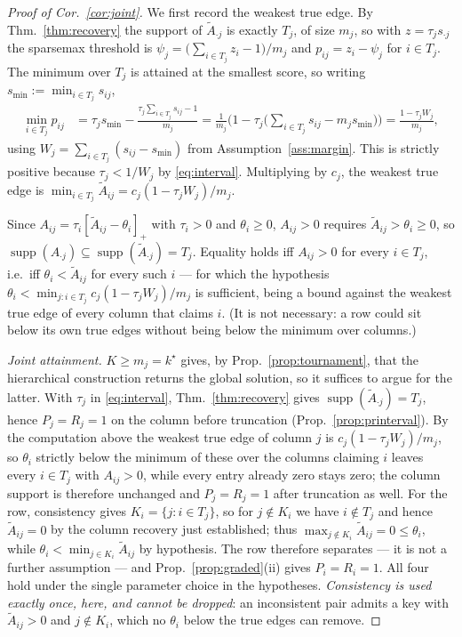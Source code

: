 \documentclass{article}
\newcommand{\supp}{\operatorname{supp}}
\begin{document}
\begin{proof}[Proof of Cor.~\ref{cor:joint}]
We first record the weakest true edge. By Thm.~\ref{thm:recovery} the support of $\tilde A_{\cdot j}$ is exactly $T_j$, of size
$m_j$, so with $z = \tau_j s_{\cdot j}$ the sparsemax threshold is
$\psi_j = \big(\sum_{i \in T_j} z_i - 1\big)/m_j$ and $p_{ij} = z_i - \psi_j$ for
$i \in T_j$. The minimum over $T_j$ is attained at the smallest score, so writing
$s_{\min} := \min_{i \in T_j} s_{ij}$,
\begin{align*}
\min_{i \in T_j} p_{ij}
&= \tau_j s_{\min} - \frac{\tau_j\sum_{i \in T_j} s_{ij} - 1}{m_j}
= \frac{1}{m_j}\Big(1 - \tau_j\Big(\sum_{i\in T_j} s_{ij} - m_j s_{\min}\Big)\Big)
= \frac{1 - \tau_j W_j}{m_j},
\end{align*}
using $W_j = \sum_{i \in T_j}(s_{ij} - s_{\min})$ from Assumption~\ref{ass:margin}. This is
strictly positive because $\tau_j < 1/W_j$ by \eqref{eq:interval}. Multiplying by $c_j$, the
weakest true edge is $\min_{i \in T_j}\tilde A_{ij} = c_j(1-\tau_j W_j)/m_j$.

Since $A_{ij} = \tau_i[\tilde A_{ij} - \theta_i]_+$ with $\tau_i>0$ and $\theta_i \geq 0$,
$A_{ij}>0$ requires $\tilde A_{ij} > \theta_i \ge 0$, so
$\supp(A_{\cdot j}) \subseteq \supp(\tilde A_{\cdot j}) = T_j$. Equality holds iff
$A_{ij} > 0$ for every $i \in T_j$, i.e.\ iff $\theta_i < \tilde A_{ij}$ for every such $i$ ---
for which the hypothesis $\theta_i < \min_{j : i\in T_j} c_j(1-\tau_j W_j)/m_j$ is sufficient,
being a bound against the weakest true edge of every column that claims $i$. (It is not
necessary: a row could sit below its own true edges without being below the minimum over
columns.)

\emph{Joint attainment.} $K \geq m_j = k^\star$ gives, by Prop.~\ref{prop:tournament}, that the hierarchical
construction returns the global solution, so it suffices to argue for the latter. With
$\tau_j$ in \eqref{eq:interval}, Thm.~\ref{thm:recovery} gives
$\supp(\tilde A_{\cdot j}) = T_j$, hence $P_j = R_j = 1$ on the column before truncation
(Prop.~\ref{prop:printerval}). By the computation above the weakest true edge of column $j$ is
$c_j(1-\tau_j W_j)/m_j$, so $\theta_i$ strictly below the minimum of these over the columns
claiming $i$ leaves every $i \in T_j$ with $A_{ij} > 0$, while every entry already zero stays
zero; the column support is therefore unchanged and $P_j = R_j = 1$ after truncation as well.
For the row, consistency gives $K_i=\{j : i\in T_j\}$, so for $j\notin K_i$ we have $i\notin T_j$
and hence $\tilde A_{ij}=0$ by the column recovery just established; thus
$\max_{j\notin K_i}\tilde A_{ij}=0\le\theta_i$, while $\theta_i<\min_{j\in K_i}\tilde A_{ij}$ by
hypothesis. The row therefore separates --- it is not a further assumption --- and
Prop.~\ref{prop:graded}(ii) gives $P_i = R_i = 1$. All four hold under the single parameter
choice in the hypotheses. \emph{Consistency is used exactly once, here, and cannot be dropped}: an
inconsistent pair admits a key with $\tilde A_{ij}>0$ and $j\notin K_i$, which no $\theta_i$
below the true edges can remove.
\end{proof}
\end{document}
